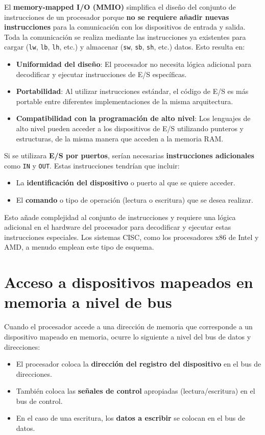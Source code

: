 \documentclass{article}
\begin{document}
	El \textbf{memory-mapped I/O (MMIO)} simplifica el diseño del conjunto de instrucciones de un procesador porque \textbf{no se requiere añadir nuevas instrucciones} para la comunicación con los dispositivos de entrada y salida. Toda la comunicación se realiza mediante las instrucciones ya existentes para cargar (\texttt{lw}, \texttt{lb}, \texttt{lh}, etc.) y almacenar (\texttt{sw}, \texttt{sb}, \texttt{sh}, etc.) datos. Esto resulta en:
	\begin{itemize}
		\item \textbf{Uniformidad del diseño}: El procesador no necesita lógica adicional para decodificar y ejecutar instrucciones de E/S específicas.
		\item \textbf{Portabilidad}: Al utilizar instrucciones estándar, el código de E/S es más portable entre diferentes implementaciones de la misma arquitectura.
		\item \textbf{Compatibilidad con la programación de alto nivel}: Los lenguajes de alto nivel pueden acceder a los dispositivos de E/S utilizando punteros y estructuras, de la misma manera que acceden a la memoria RAM.
	\end{itemize}
	
	Si se utilizara \textbf{E/S por puertos}, serían necesarias \textbf{instrucciones adicionales} como \texttt{IN} y \texttt{OUT}. Estas instrucciones tendrían que incluir:
	\begin{itemize}
		\item La \textbf{identificación del dispositivo} o puerto al que se quiere acceder.
		\item El \textbf{comando} o tipo de operación (lectura o escritura) que se desea realizar.
	\end{itemize}
	Esto añade complejidad al conjunto de instrucciones y requiere una lógica adicional en el hardware del procesador para decodificar y ejecutar estas instrucciones especiales. Los sistemas CISC, como los procesadores x86 de Intel y AMD, a menudo emplean este tipo de esquema.
	
	\section{Acceso a dispositivos mapeados en memoria a nivel de bus}
	
	Cuando el procesador accede a una dirección de memoria que corresponde a un dispositivo mapeado en memoria, ocurre lo siguiente a nivel del bus de datos y direcciones:
	\begin{itemize}
		\item El procesador coloca la \textbf{dirección del registro del dispositivo} en el bus de direcciones.
		\item También coloca las \textbf{señales de control} apropiadas (lectura/escritura) en el bus de control.
		\item En el caso de una escritura, los \textbf{datos a escribir} se colocan en el bus de datos.
	\end{itemize}
	
\end{document}
